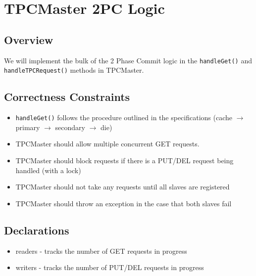 \section{TPCMaster 2PC Logic}
\subsection{Overview}
We will implement the bulk of the 2 Phase Commit logic in the \texttt{handleGet()} and \texttt{handleTPCRequest()} methods in TPCMaster.
\subsection{Correctness Constraints}
\begin{itemize}
\item \texttt{handleGet()} follows the procedure outlined in the specifications (cache $\rightarrow$ primary $\rightarrow$ secondary $\rightarrow$ die)
\item TPCMaster should allow multiple concurrent GET requests.
\item TPCMaster should block requests if there is a PUT/DEL request being handled (with a lock)
\item TPCMaster should not take any requests until all slaves are registered
\item TPCMaster should throw an exception in the case that both slaves fail
\end{itemize}
\subsection{Declarations}
\begin{itemize}
\item readers - tracks the number of GET requests in progress
\item writers - tracks the number of PUT/DEL requests in progress
\end{itemize}
